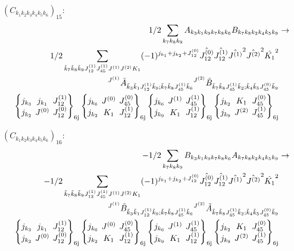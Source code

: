 \documentclass[11pt]{article}
\newcommand{\sixj}[6]{\begingroup\setlength{\arraycolsep}{0.2em}\begin{Bmatrix} #1 & #2 & #3 \\ #4 & #5 & #6 \end{Bmatrix}_{\text{6j}}\endgroup}
\begin{document}
$\left({C}_{{k}_{1}{k}_{2}{k}_{3}{k}_{4}{k}_{5}{k}_{6}}\right)_{15}$:
\begin{align}
1/2\sum_{{k}_{7}{k}_{8}{k}_{9}}{A}_{{k}_{3}{k}_{1}{k}_{9}{k}_{7}{k}_{8}{k}_{6}}{B}_{{k}_{7}{k}_{8}{k}_{2}{k}_{4}{k}_{5}{k}_{9}}&\rightarrow \notag \\1/2\sum_{\tilde{k}_{7}\tilde{k}_{8}\tilde{k}_{9}J^{(1)}_{12}J^{(1)}_{45}J^{(1)}J^{(2)}K_{1}}(-1)^{j_{{k}_{1}} +j_{{k}_{2}} +J^{(0)}_{12} }\hat{J^{(0)}_{12}}\hat{J^{(1)}_{12}}\hat{J^{(1)}}^{2}\hat{J^{(2)}}^{2}\hat{K_{1}}^{2}& \notag \\{}^{J^{(1)}}\tilde{A}_{\tilde{k}_{3}\tilde{k}_{1}J^{(1)}_{12}\tilde{k}_{9};\tilde{k}_{7}\tilde{k}_{8}J^{(1)}_{45}\tilde{k}_{6}}{}^{J^{(2)}}\tilde{B}_{\tilde{k}_{7}\tilde{k}_{8}J^{(1)}_{45}\tilde{k}_{2};\tilde{k}_{4}\tilde{k}_{5}J^{(0)}_{45}\tilde{k}_{9}}& \notag \\\sixj{j_{{k}_{3}}}{j_{{k}_{1}}}{J^{(1)}_{12}}{j_{{k}_{2}}}{J^{(0)}}{J^{(0)}_{12}}\sixj{j_{{k}_{6}}}{J^{(0)}}{J^{(0)}_{45}}{j_{{k}_{2}}}{K_{1}}{J^{(1)}_{12}}\sixj{j_{{k}_{6}}}{J^{(1)}}{J^{(1)}_{45}}{j_{{k}_{9}}}{K_{1}}{J^{(1)}_{12}}\sixj{j_{{k}_{2}}}{K_{1}}{J^{(0)}_{45}}{j_{{k}_{9}}}{J^{(2)}}{J^{(1)}_{45}}
\end{align}

$\left({C}_{{k}_{1}{k}_{2}{k}_{3}{k}_{4}{k}_{5}{k}_{6}}\right)_{16}$:
\begin{align}
-1/2\sum_{{k}_{7}{k}_{8}{k}_{9}}{B}_{{k}_{3}{k}_{1}{k}_{9}{k}_{7}{k}_{8}{k}_{6}}{A}_{{k}_{7}{k}_{8}{k}_{2}{k}_{4}{k}_{5}{k}_{9}}&\rightarrow \notag \\-1/2\sum_{\tilde{k}_{7}\tilde{k}_{8}\tilde{k}_{9}J^{(1)}_{12}J^{(1)}_{45}J^{(1)}J^{(2)}K_{1}}(-1)^{j_{{k}_{1}} +j_{{k}_{2}} +J^{(0)}_{12} }\hat{J^{(0)}_{12}}\hat{J^{(1)}_{12}}\hat{J^{(1)}}^{2}\hat{J^{(2)}}^{2}\hat{K_{1}}^{2}& \notag \\{}^{J^{(1)}}\tilde{B}_{\tilde{k}_{3}\tilde{k}_{1}J^{(1)}_{12}\tilde{k}_{9};\tilde{k}_{7}\tilde{k}_{8}J^{(1)}_{45}\tilde{k}_{6}}{}^{J^{(2)}}\tilde{A}_{\tilde{k}_{7}\tilde{k}_{8}J^{(1)}_{45}\tilde{k}_{2};\tilde{k}_{4}\tilde{k}_{5}J^{(0)}_{45}\tilde{k}_{9}}& \notag \\\sixj{j_{{k}_{3}}}{j_{{k}_{1}}}{J^{(1)}_{12}}{j_{{k}_{2}}}{J^{(0)}}{J^{(0)}_{12}}\sixj{j_{{k}_{6}}}{J^{(0)}}{J^{(0)}_{45}}{j_{{k}_{2}}}{K_{1}}{J^{(1)}_{12}}\sixj{j_{{k}_{6}}}{J^{(1)}}{J^{(1)}_{45}}{j_{{k}_{9}}}{K_{1}}{J^{(1)}_{12}}\sixj{j_{{k}_{2}}}{K_{1}}{J^{(0)}_{45}}{j_{{k}_{9}}}{J^{(2)}}{J^{(1)}_{45}}
\end{align}
\end{document}
